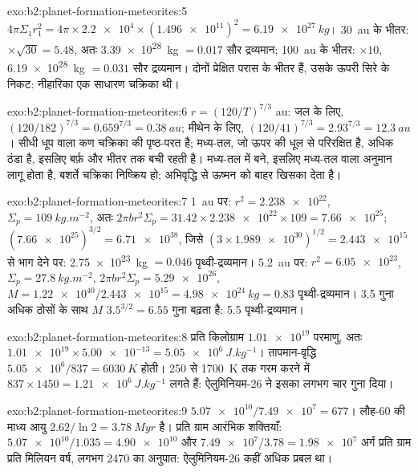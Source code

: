 \begin{solution}{exo:b2:planet-formation-meteorites:5}
$4\pi\Sigma_1 r_1^2 = 4\pi\times\num{2.2e4}\times(\num{1.496e11})^2 =
\qty{6.19e27}{kg}$। \qty{30}{au} के भीतर: $\times\sqrt{30} = 5.48$, अतः
\qty{3.39e28}{kg} $= 0.017$ सौर द्रव्यमान; \qty{100}{au} के भीतर: $\times10$,
\qty{6.19e28}{kg} $= 0.031$ सौर द्रव्यमान। दोनों प्रेक्षित परास के भीतर हैं,
उसके ऊपरी सिरे के निकट: नीहारिका एक साधारण चक्रिका थी।
\end{solution}

\begin{solution}{exo:b2:planet-formation-meteorites:6}
$r = (120/T)^{7/3}$ au: जल के लिए, $(120/182)^{7/3} = 0.659^{7/3} =
\qty{0.38}{au}$; मीथेन के लिए, $(120/41)^{7/3} = 2.93^{7/3} = \qty{12.3}{au}$।
सीधी धूप वाला कण चक्रिका की पृष्ठ-परत है; मध्य-तल,
जो ऊपर की धूल से परिरक्षित है, अधिक ठंडा है, इसलिए बर्फ़ और भीतर तक बची रहती है।
 मध्य-तल में बने, इसलिए मध्य-तल वाला अनुमान लागू होता है, बशर्ते
चक्रिका निष्क्रिय हो; अभिवृद्धि से ऊष्मन  को बाहर खिसका देता है।
\end{solution}

\begin{solution}{exo:b2:planet-formation-meteorites:7}
\qty{1}{au} पर: $r^2 = \num{2.238e22}$, $\Sigma_p = \qty{109}{kg.m^{-2}}$, अतः
$2\pi b r^2\Sigma_p = 31.42\times\num{2.238e22}\times109 = \num{7.66e25}$;
$(\num{7.66e25})^{3/2} = \num{6.71e38}$, जिसे
$(3\times\num{1.989e30})^{1/2} = \num{2.443e15}$ से भाग देने पर: \qty{2.75e23}{kg}
$= 0.046$ पृथ्वी-द्रव्यमान। \qty{5.2}{au} पर: $r^2 = \num{6.05e23}$,
$\Sigma_p = \qty{27.8}{kg.m^{-2}}$, $2\pi b r^2\Sigma_p = \num{5.29e26}$,
$M = \num{1.22e40}/\num{2.443e15} = \qty{4.98e24}{kg} = 0.83$ पृथ्वी-द्रव्यमान।
\num{3.5} गुना अधिक ठोसों के साथ $M$ $3.5^{3/2} = 6.55$ गुना बढ़ता है: 5.5
पृथ्वी-द्रव्यमान।
\end{solution}

\begin{solution}{exo:b2:planet-formation-meteorites:8}
प्रति किलोग्राम $\num{1.01e19}$ परमाणु, अतः
$\num{1.01e19}\times\num{5.00e-13} = \qty{5.05e6}{J.kg^{-1}}$। तापमान-वृद्धि
$\num{5.05e6}/837 = \qty{6030}{K}$ होती। \num{250} से
\qty{1700}{K} तक गरम करने में $837\times1450 = \qty{1.21e6}{J.kg^{-1}}$ लगते हैं: ऐलुमिनियम-26
ने इसका लगभग चार गुना दिया।
\end{solution}

\begin{solution}{exo:b2:planet-formation-meteorites:9}
$\num{5.07e10}/\num{7.49e7} = 677$। लौह-60 की माध्य आयु
$2.62/\ln2 = \qty{3.78}{Myr}$ है। प्रति ग्राम आरंभिक शक्तियाँ:
$\num{5.07e10}/1.035 = \num{4.90e10}$ और $\num{7.49e7}/3.78 = \num{1.98e7}$ अर्ग प्रति
ग्राम प्रति मिलियन वर्ष, लगभग \num{2470} का अनुपात: ऐलुमिनियम-26 कहीं अधिक प्रबल था।
\end{solution}

